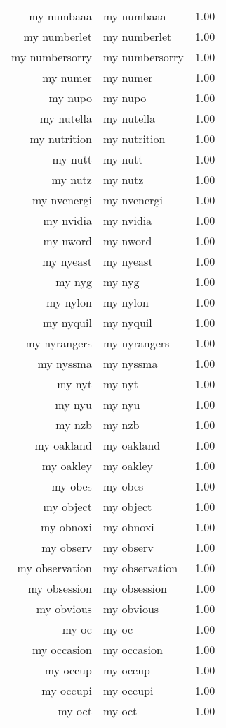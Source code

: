\begin{table}[ht]
\begin{tabular}{rlr}
  my numbaaa & my numbaaa & 1.00 \\ 
  my numberlet & my numberlet & 1.00 \\ 
  my numbersorry & my numbersorry & 1.00 \\ 
  my numer & my numer & 1.00 \\ 
  my nupo & my nupo & 1.00 \\ 
  my nutella & my nutella & 1.00 \\ 
  my nutrition & my nutrition & 1.00 \\ 
  my nutt & my nutt & 1.00 \\ 
  my nutz & my nutz & 1.00 \\ 
  my nvenergi & my nvenergi & 1.00 \\ 
  my nvidia & my nvidia & 1.00 \\ 
  my nword & my nword & 1.00 \\ 
  my nyeast & my nyeast & 1.00 \\ 
  my nyg & my nyg & 1.00 \\ 
  my nylon & my nylon & 1.00 \\ 
  my nyquil & my nyquil & 1.00 \\ 
  my nyrangers & my nyrangers & 1.00 \\ 
  my nyssma & my nyssma & 1.00 \\ 
  my nyt & my nyt & 1.00 \\ 
  my nyu & my nyu & 1.00 \\ 
  my nzb & my nzb & 1.00 \\ 
  my oakland & my oakland & 1.00 \\ 
  my oakley & my oakley & 1.00 \\ 
  my obes & my obes & 1.00 \\ 
  my object & my object & 1.00 \\ 
  my obnoxi & my obnoxi & 1.00 \\ 
  my observ & my observ & 1.00 \\ 
  my observation & my observation & 1.00 \\ 
  my obsession & my obsession & 1.00 \\ 
  my obvious & my obvious & 1.00 \\ 
  my oc & my oc & 1.00 \\ 
  my occasion & my occasion & 1.00 \\ 
  my occup & my occup & 1.00 \\ 
  my occupi & my occupi & 1.00 \\ 
  my oct & my oct & 1.00 \\ 

\end{tabular}
\end{table}
